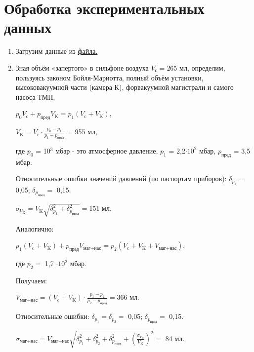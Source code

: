 \documentclass[a4paper,12pt]{article} %
\begin{document}
\section*{Обработка экспериментальных данных}
\setcounter{page}{26}

\begin{enumerate}
	\item Загрузим данные из \href{file:Data.xlsx}{файла.}
	
	\item Зная объём «запертого» в сильфоне воздуха $V_{\text{с}} = 265$ мл, определим,
	пользуясь законом Бойля-Мариотта, полный объём установки, высоковакуумной части (камера К), форвакуумной магистрали и самого насоса ТМН.
	
	$p_{0}V_{\text{c}} + p_{\text{пред}}V_{\text{K}} = p_{1}(V_{\text{c}} + V_{\text{K}})$,
	
	
	$V_{\text{K}} = V_{\text{c}}\cdot\frac{p_{0} - p_{1}}{p_{1} - p_{\text{пред}}}$ = 955 мл,
	
	где $p_{0}$ = 10$^3$ мбар - это атмосферное давление, $p_{1}$ = 2,2$\cdot 10^2$ мбар, $p_{\text{пред}}$ = 3,5 мбар.
	
	Относительные ошибки значений давлений (по паспортам приборов): $\delta_{p_{1}} = $ 0,05; $\delta_{p_{\text{пред}}} = $ 0,15.
	
	$\sigma_{V_{\text{K}}} = V_{\text{K}}\sqrt{\delta_{p_{1}}^2 + \delta_{p_{\text{пред}}}^2} = $151 мл.
	
	\begin{center}
	\end{center}

	Аналогично:
	
	$p_{1}(V_{\text{c}} + V_{\text{K}}) + p_{\text{пред}}V_{\text{маг+нас}} = p_{2}(V_{\text{c}} + V_{\text{K}} + V_{\text{маг+нас}})$,
	
	где $p_{2} =$ 1,7 $\cdot 10^2$ мбар.
	
	Получаем:
	
	$V_{\text{маг+нас}} = (V_{\text{c}} + V_{\text{K}})\cdot\frac{p_{1} - p_{2}}{p_{2} - p_{\text{пред}}} = 366$ мл.
	
	Относительные ошибки: $\delta_{p_{1}} = \delta_{p_{2}} = $ 0,05; $\delta_{p_{\text{пред}}} = $ 0,15. 
	
	$\sigma_{\text{маг+нас}} = V_{\text{маг+нас}}\sqrt{\delta_{p_{1}}^2 + \delta_{p_{2}}^2 + \delta_{p_{\text{пред}}}^2 + \left(\frac{\sigma_{V_{\text{K}}}}{V_{\text{K}}}\right)^2} = $ 84 мл.
	

\end{enumerate}
\end{document}
